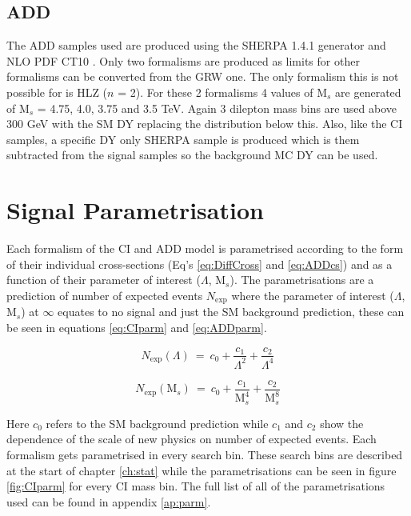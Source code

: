 	\subsection*{ADD}

	The ADD samples used are produced using the SHERPA 1.4.1 \cite{1126-6708-2009-02-007} generator and NLO PDF CT10 \cite{Lai:2010vv}. Only two formalisms are produced as limits for other formalisms can be converted from the GRW one. The only formalism this is not possible for is HLZ ($n$ = 2). For these 2 formalisms 4 values of M$_{s}$ are generated of M$_{s}$ = 4.75, 4.0, 3.75 and 3.5 TeV. Again 3 dilepton mass bins are used above 300 GeV with the SM DY replacing the distribution below this. Also, like the CI samples, a specific DY only SHERPA sample is produced which is them subtracted from the signal samples so the background MC DY can be used.



\section{Signal Parametrisation}
	\label{sec:parm}

	Each formalism of the CI and ADD model is parametrised according to the form of their individual cross-sections (Eq's \ref{eq:DiffCross} and \ref{eq:ADDcs}) and as a function of their parameter of interest ($\Lambda$, M$_{s}$). The parametrisations are a prediction of number of expected events $N_{\text{exp}}$ where the parameter of interest ($\Lambda$, M$_{s}$) at $\infty$ equates to no signal and just the SM background prediction, these can be seen in equations \ref{eq:CIparm} and \ref{eq:ADDparm}. 

	\begin{equation}
        N_{\text{exp}}(\Lambda)~=~c_{0} + \frac{c_{1}}{\Lambda^{2}} + \frac{c_{2}}{\Lambda^{4}}
        \label{eq:CIparm}
    \end{equation}

    \begin{equation}
        N_{\text{exp}}(\text{M}_{s})~=~c_{0} + \frac{c_{1}}{\text{M}_{s}^{4}} + \frac{c_{2}}{\text{M}_{s}^{8}}
        \label{eq:ADDparm}
    \end{equation}

	Here $c_{0}$ refers to the SM background prediction while $c_{1}$ and $c_{2}$ show the dependence of the scale of new physics on number of expected events. Each formalism gets parametrised in every search bin. These search bins are described at the start of chapter \ref{ch:stat} while the parametrisations can be seen in figure \ref{fig:CIparm} for every CI mass bin. The full list of all of the parametrisations used can be found in appendix \ref{ap:parm}.


